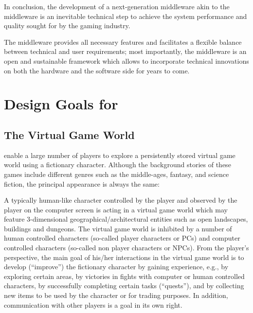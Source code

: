 \documentclass[a4paper, 10pt]{book}
\begin{document}
In conclusion, the development of a next-generation \MMORG middleware  akin to
the \SYNEIGHT middleware is an inevitable technical step to achieve the system
performance and quality sought for by the gaming industry.

The \SYNEIGHT middleware provides all necessary features and facilitates a flexible
balance between technical and user requirements; most importantly, the \SYNEIGHT
middleware is an open and sustainable framework which allows to incorporate
technical innovations on both the hardware and the software side for years to
come.

\small

\tableofcontents

\normalsize




\chapter{Design Goals for \MMORGS}


%
%

\section{The Virtual Game World}

\MMORGS enable a large number of players to explore a persistently stored
virtual game world using a fictionary character. Although the background
stories of these games include different genres such as the middle-ages,
fantasy, and science fiction, the principal appearance is always the same: 

A typically human-like character controlled by the player and observed
by the player on the computer screen is acting in a virtual game
world which may feature 3-dimensional geographical/architectural entities such as 
open landscapes, buildings and dungeons. The virtual game world is 
inhibited by a number of human controlled characters 
(so-called player characters or PCs) and
computer controlled characters (so-called non player characters or
NPCs). From the player's perspective, the main goal of his/her
interactions in the virtual game world is to develop (``improve'') 
the fictionary character by gaining experience, e.g., 
by exploring certain areas, by victories in fights with computer or human
controlled characters, by successfully completing certain tasks (``quests''), 
and by collecting new items to be used by the character or for
trading purposes. In addition, communication with other players is a
goal in its own right.
%
\end{document}
